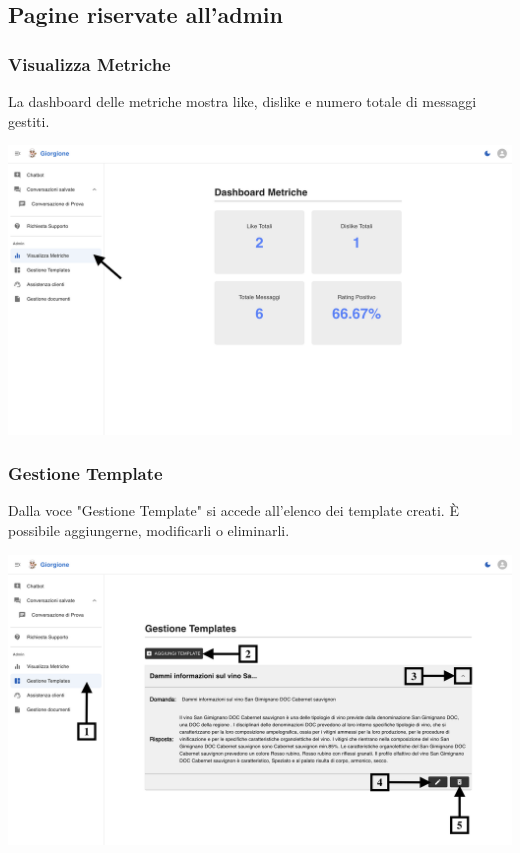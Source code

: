 \newpage
\subsection{Pagine riservate all'admin}

\subsubsection{Visualizza Metriche}
La dashboard delle metriche mostra like, dislike e numero totale di messaggi gestiti.
\begin{center}
    \includegraphics[width=\textwidth]{./img/visualizzaMetriche.png}
    \label{fig:Metriche}
\end{center}

\subsubsection{Gestione Template}
Dalla voce "Gestione Template" si accede all’elenco dei template creati. È possibile aggiungerne, modificarli o eliminarli.
\begin{center}
    \includegraphics[width=\textwidth]{./img/GestioneTemplate.png}
    \label{fig:Template}
\end{center}


